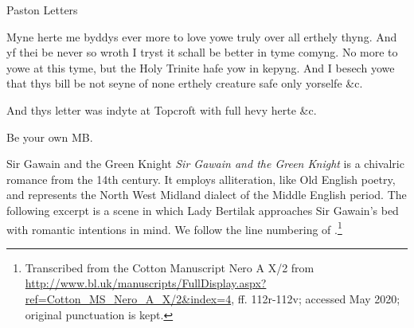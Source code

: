 \begin{texts}{Paston Letters}
\begin{textglossed}
  Myne herte me byddys ever more to love yowe truly over all erthely thyng. And yf thei be never so wroth I tryst it schall be better in tyme comyng. No more to yowe at this tyme, but the Holy Trinite hafe yow in kepyng. And I besech yowe that thys bill be not seyne of none erthely creature safe only yorselfe \&c.

  And thys letter was indyte at Topcroft with full hevy herte \&c.

  Be your own MB.
\end{textglossed}


\end{texts}

\begin{texts}{Sir Gawain and the Green Knight}\label{me-gawain}
\textit{Sir Gawain and the Green Knight} is a chivalric romance from the 14th century. It employs alliteration, like Old English poetry, and represents the North West Midland dialect of the Middle English period. The following excerpt is a scene in which Lady Bertilak approaches Sir Gawain's bed with romantic intentions in mind. We follow the line numbering of \citet{TolkienGordon1967}.\footnote{Transcribed from the Cotton Manuscript Nero A X/2 from \url{http://www.bl.uk/manuscripts/FullDisplay.aspx?ref=Cotton_MS_Nero_A_X/2&index=4}, ff. 112r-112v; accessed May 2020; original punctuation is kept.}


\end{texts}
